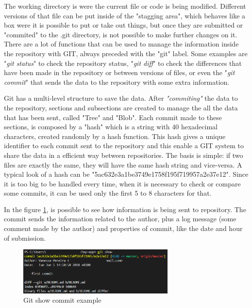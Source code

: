\documentclass[mim_thesis.tex]{subfiles}
\begin{document}
The working directory is were the current file or code is being modified. Different versions of that file can be put inside of the "stagging area", which behaves like a box were it is possible to put or take out things, but once they are submitted or "commited" to the .git directory, is not possible to make further changes on it. There are a lot of functions that can be used to manage the information inside the repository with GIT, always preceded with the "git" label. Some examples are "\textit{git status}" to check the repository status, "\textit{git diff}" to check the differences that have been made in the repository or between versions of files, or even the "\textit{git commit}" that sends the data to the repository with some extra information.

Git has a multi-level structure to save the data. After \textit{"commiting"} the data to the repository, sections and subsections are created to manage the all the data that has been sent, called "Tree" and "Blob". Each commit made to these sections, is composed by a "hash" which is a string with 40 hexadecimal characters, created randomly by a hash function. This hash gives a unique identifier to each commit sent to the repository and this enable a GIT system to share the data in a efficient way between repositories. The basis is simple: if two files are exactly the same, they will have the same hash string and vice-versa. A typical look of a hash can be "5ac632e3a1be3749e1758f195f719957a2e37e12". Since it is too big to be handled every time, when it is necessary to check or compare some commits, it can be used only the first 5 to 8 characters for that.

In the figure \ref{fig:commit_example}, is possible to see how information is being sent to repository. The commit sends the information related to the author, plus a log message (some comment made by the author) and properties of commit, like the date and hour of submission. 

\begin{figure}[H]
	\centering
    \includegraphics[width=0.7\textwidth]{img/commit_example.PNG}
	\caption{Git show commit example}
	\label{fig:commit_example}
\end{figure}
\end{document}
